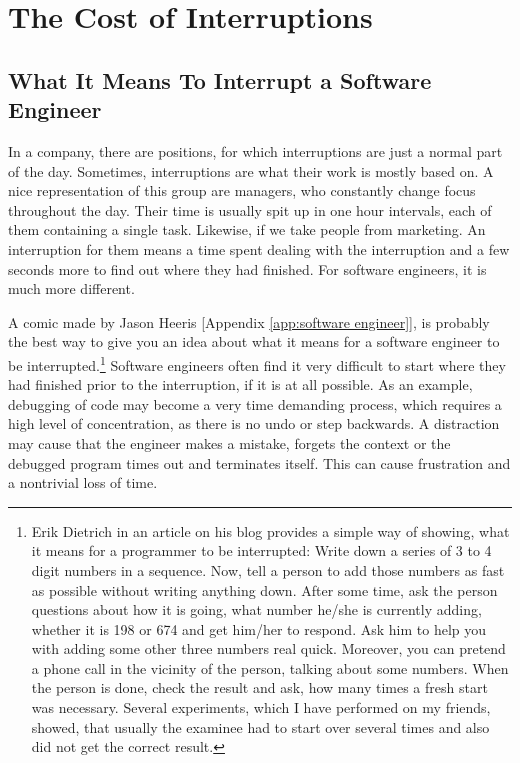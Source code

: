 \documentclass[11pt,singleside]{myfithesis2}
\begin{document}
	\section{The Cost of Interruptions}

		\subsection{What It Means To Interrupt a Software Engineer}
In a company, there are positions, for which interruptions are just a normal part of the day. Sometimes, interruptions are what their work is mostly based on. A nice representation of this group are managers, who constantly change focus throughout the day. Their time is usually spit up in one hour intervals, each of them containing a single task. Likewise, if we take people from marketing. An interruption for them means a time spent dealing with the interruption and a few seconds more to find out where they had finished. For software engineers, it is much more different.

A comic made by Jason Heeris [Appendix \ref{app:software engineer}],  is probably the best way to give you an idea about what it means for a software engineer to be interrupted.\footnote{Erik Dietrich in an article on his blog \cite{costOfInterruptions} provides a simple way of showing, what it means for a programmer to be interrupted: Write down a series of 3 to 4 digit numbers in a sequence. Now, tell a person to add those numbers as fast as possible without writing anything down. After some time, ask the person questions about how it is going, what number he/she is currently adding, whether it is 198 or 674 and get him/her to respond. Ask him to help you with adding some other three numbers real quick. Moreover, you can pretend a phone call in the vicinity of the person, talking about some numbers. When the person is done, check the result and ask, how many times a fresh start was necessary. Several experiments, which I have performed on my friends, showed, that usually the examinee had to start over several times and also did not get the correct result.} Software engineers often find it very difficult to start where they had finished prior to the interruption, if it is at all possible. As an example, debugging of code may become a very time demanding process, which requires a high level of concentration, as there is no undo or step backwards. A distraction may cause that the engineer makes a mistake, forgets the context or the debugged program times out and terminates itself. This can cause frustration and a nontrivial loss of time.
\end{document}
